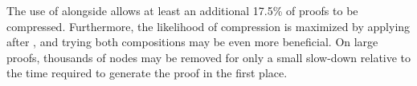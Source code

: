 


The use of {\FORPI} alongside {\GFOLU} allows at least an additional 17.5\% of proofs to be compressed. Furthermore, the likelihood of compression is maximized by applying {\FORPI} after {\GFOLU}, and trying both compositions may be even more beneficial. On large proofs, thousands of nodes may be removed for only a small slow-down relative to the time required to generate the proof in the first place.



